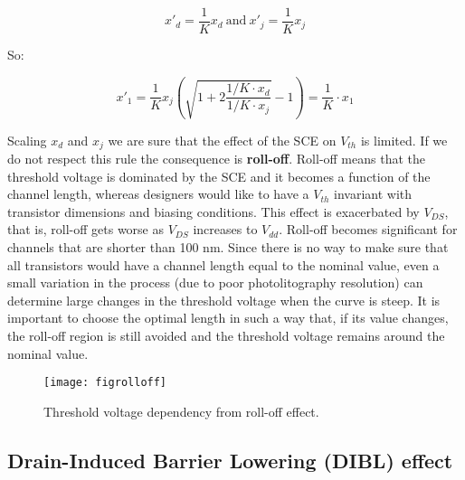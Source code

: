 \documentclass[a4paper, 12pt, twoside, openright]{report}
\begin{document}
	\begin{equation}
	x'_d = \frac{1}{K} x_d\ \text{and}\ x'_j = \frac{1}{K} x_j
	\end{equation}

So:

	\begin{equation}
	x'_1 = \frac{1}{K} x_j \left( \sqrt{1+ 2\frac{1/K \cdot x_d}{1/K \cdot x_j}} - 1 \right) = \frac{1}{K} \cdot x_1
	\end{equation}

Scaling $x_{d}$ and $x_{j}$ we are sure that the effect of the SCE on $V_{th}$ is limited. If we do not respect this rule the consequence is \textbf{roll-off}. Roll-off means that the threshold voltage is dominated by the SCE and it becomes a function of the channel length, whereas designers would like to have a $V_{th}$ invariant with transistor dimensions and biasing conditions. This effect is exacerbated by $V_{DS}$, that is, roll-off gets worse as $V_{DS}$ increases to $V_{dd}$. Roll-off becomes significant for channels that are shorter than 100 nm. Since there is no way to make sure that all transistors would have a channel length equal to the nominal value, even a small variation in the process (due to poor photolitography resolution) can determine large changes in the threshold voltage when the curve is steep. It is important to choose the optimal length in such a way that, if its value changes, the roll-off region is still avoided and the threshold voltage remains around the nominal value.


	\begin{figure}[H]
	\centering
	\texttt{[image: figrolloff]}
	\caption{Threshold voltage dependency from roll-off effect.}
	\label{}
	\end{figure}



\subsection{Drain-Induced Barrier Lowering (DIBL) effect}
\end{document}
